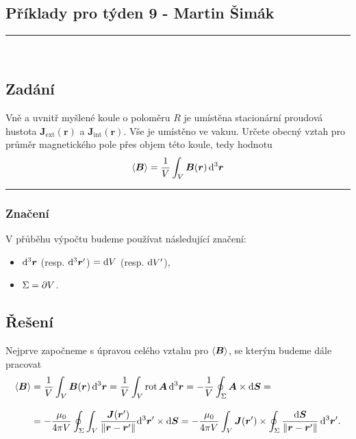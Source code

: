 \documentclass[12pt,a4paper]{report}
\renewcommand{\vec}{\boldsymbol}
\def\endl{\\[3mm]}
\begin{document}
	
	\begin{center}
		\section*{Příklady pro týden 9 - Martin Šimák}
		\noindent\rule{13cm}{1.6pt} \\[5mm]
	\end{center}
	
	\subsection*{Zadání}
		Vně  a  uvnitř  myšlené  koule  o  poloměru $R$  je  umístěna  stacionární  proudová  hustota $\vec J_{\mathrm{ext}}(\vec r)$ a $\vec J_{\mathrm{int}}(\vec r)$. Vše je umístěno ve vakuu. Určete obecný vztah pro průměr magnetického pole přes objem této koule, tedy hodnotu
		\begin{align*}
			\stred{\vec B} = \frac 1V \int_V \vec B(\vec r) \, \d^3 \vec r
		\end{align*}
	\noindent\rule{8cm}{0.4pt}
	
	\subsubsection*{Značení}
		V přůběhu výpočtu budeme používat následující značení:
		\begin{itemize}
			\item $\d^3 \vec r$ (resp. $\d^3 \vec r'$) $ = {\mathrm d} V$ (resp. ${\mathrm d} V'$),
			\item $\Sigma = \partial V$.
		\end{itemize}
	
	\subsection*{Řešení}
	
		Nejprve započneme s úpravou celého vztahu pro $\stred{\vec B}$, se kterým budeme dále pracovat
		\begin{align*}
			\stred {\vec B} &= \frac 1V \int_V \vec B(\vec r) \, \d^3 \vec r = \frac 1V \int_V \rot \vec A \, \d^3\vec r = -\frac 1V \oint_\Sigma \vec A \times \d \vec S =
			\endl
			&= -\frac{\mu_0}{4\pi V}\oint_\Sigma \int_V \frac{\vec J(\vec r')}{\| \vec r - \vec r'\|} \d^3 \vec r' \times \d \vec S = - \frac{\mu_0}{4\pi V}\int_V \vec J(\vec r') \times \oint_\Sigma \frac{\d \vec S}{\| \vec r - \vec r' \|} \, \d^3\vec r' .
		\end{align*}
		
\end{document}
